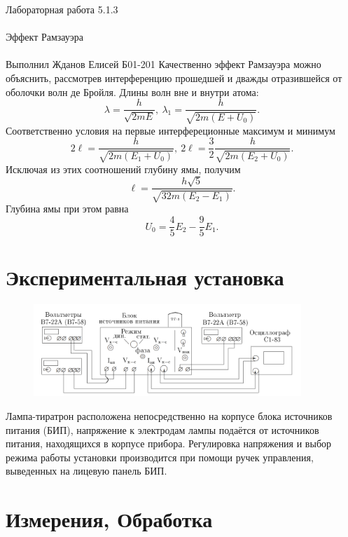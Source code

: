 \documentclass{astroedu-lab}
\begin{document}
\begin{problem}{\huge Лабораторная работа 5.1.3\\\\Эффект Рамзауэра\\\\Выполнил Жданов Елисей Б01-201}
Качественно эффект Рамзауэра можно объяснить, рассмотрев интерференцию прошедшей и дважды отразившейся от оболочки волн де Бройля. Длины волн вне и внутри атома:
\[\lambda = \dfrac{h}{\sqrt{2mE}},~\lambda_1 = \dfrac{h}{\sqrt{2m(E+U_0)}}.\]
Соответственно условия на первые интерфереционные максимум и минимум 
\begin{equation}\label{1}
2\ell = \dfrac{h}{\sqrt{2m(E_1 + U_0)}},~2\ell = \dfrac{3}{2}\dfrac{h}{\sqrt{2m(E_2 + U_0)}}.
\end{equation}
Исключая из этих соотношений глубину ямы, получим
\begin{equation}\label{2}
\ell = \dfrac{h\sqrt{5}}{\sqrt{32m(E_2 - E_1)}}.
\end{equation}
Глубина ямы при этом равна
\begin{equation}\label{4}
U_0 = \dfrac{4}{5}E_2 - \dfrac{9}{5}E_1.
\end{equation}

\section{Экспериментальная установка}

\begin{figure}[!h]
	\centering
	\includegraphics[width=0.9\textwidth]{установка.png}
	\label{fig:boiler}
\end{figure}

Лампа-тиратрон расположена непосредственно на корпусе блока источников питания (БИП), напряжение к электродам лампы подаётся от источников питания, находящихся в корпусе прибора. Регулировка напряжения и выбор режима работы установки производится при помощи ручек управления, выведенных на лицевую панель БИП.


\section{Измерения, Обработка}


\end{problem}
\end{document}
